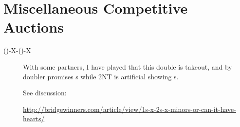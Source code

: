 \documentclass[tom-ari]{subfile}
\begin{document}
     \section{Miscellaneous Competitive Auctions}
     \begin{description}
         \item[()-X-()-X] With some partners, I have played that this double is takeout, and  by doubler promises s while 2NT is artificial showing s. 
         
         See discussion: 
         
         \url{http://bridgewinners.com/article/view/1s-x-2s-x-minors-or-can-it-have-hearts/}
         
          
     \end{description}
	
\end{document}
